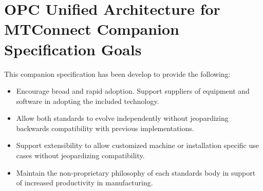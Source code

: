 \section{OPC Unified Architecture for MTConnect Companion Specification Goals}\label{goals}

This companion specification has been develop to provide the following:

\begin{itemize}
    \item Encourage broad and rapid adoption. Support suppliers of equipment and software in adopting the included technology.
    \item Allow both standards to evolve independently without jeopardizing backwards compatibility with previous implementations.
    \item Support extensibility to allow customized machine or installation specific use cases without jeopardizing compatibility.
    \item Maintain the non-proprietary philosophy of each standards body in support of increased productivity in manufacturing.
\end{itemize}
